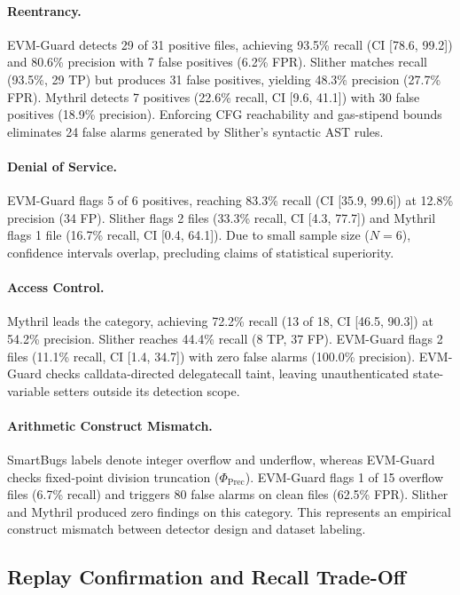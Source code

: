 \documentclass[pdflatex,sn-mathphys]{sn-jnl}
\theoremstyle{thmstyleone}
\theoremstyle{thmstyletwo}
\begin{document}
\paragraph{Reentrancy.} EVM-Guard detects 29 of 31 positive files, achieving 93.5\% recall (CI [78.6, 99.2]) and 80.6\% precision with 7 false positives (6.2\% FPR). Slither matches recall (93.5\%, 29 TP) but produces 31 false positives, yielding 48.3\% precision (27.7\% FPR). Mythril detects 7 positives (22.6\% recall, CI [9.6, 41.1]) with 30 false positives (18.9\% precision). Enforcing CFG reachability and gas-stipend bounds eliminates 24 false alarms generated by Slither's syntactic AST rules.

\paragraph{Denial of Service.} EVM-Guard flags 5 of 6 positives, reaching 83.3\% recall (CI [35.9, 99.6]) at 12.8\% precision (34 FP). Slither flags 2 files (33.3\% recall, CI [4.3, 77.7]) and Mythril flags 1 file (16.7\% recall, CI [0.4, 64.1]). Due to small sample size ($N=6$), confidence intervals overlap, precluding claims of statistical superiority.

\paragraph{Access Control.} Mythril leads the category, achieving 72.2\% recall (13 of 18, CI [46.5, 90.3]) at 54.2\% precision. Slither reaches 44.4\% recall (8 TP, 37 FP). EVM-Guard flags 2 files (11.1\% recall, CI [1.4, 34.7]) with zero false alarms (100.0\% precision). EVM-Guard checks calldata-directed delegatecall taint, leaving unauthenticated state-variable setters outside its detection scope.

\paragraph{Arithmetic Construct Mismatch.} SmartBugs labels denote integer overflow and underflow, whereas EVM-Guard checks fixed-point division truncation ($\Phi_{\mathrm{Prec}}$). EVM-Guard flags 1 of 15 overflow files (6.7\% recall) and triggers 80 false alarms on clean files (62.5\% FPR). Slither and Mythril produced zero findings on this category. This represents an empirical construct mismatch between detector design and dataset labeling.

\subsection{Replay Confirmation and Recall Trade-Off}\label{sec:results:replay}
\end{document}
